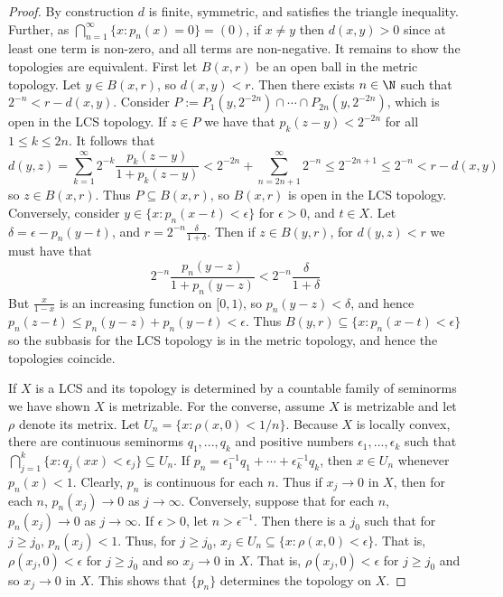 \begin{proof}
    By construction $d$ is finite, symmetric, and satisfies the triangle inequality. Further, as $\bigcap_{n=1}^{\infty}\{x:p_n(x)=0\}=(0)$, if $x\neq y$ then $d(x,y) > 0$ since at least one term is non-zero, and all terms are non-negative. It remains to show the topologies are equivalent. First let $B(x,r)$ be an open ball in the metric topology. Let $y \in B(x,r)$, so $d(x,y) < r$. Then there exists $n \in \N$ such that $2^{-n} < r-d(x,y)$. Consider $P := P_1(y,2^{-2n})\cap \cdots \cap P_{2n}(y,2^{-2n})$, which is open in the LCS topology. If $z \in P$ we have that $p_k(z-y) < 2^{-2n}$ for all $1\leq k \leq 2n$. It follows that $$d(y,z) = \sum_{k=1}^{\infty}2^{-k}\frac{p_k(z-y)}{1+p_k(z-y)} < 2^{-2n}+\sum_{n=2n+1}^{\infty}2^{-n} \leq  2^{-2n+1} \leq 2^{-n} < r-d(x,y)$$
    so $z \in B(x,r)$. Thus $P \subseteq B(x,r)$, so $B(x,r)$ is open in the LCS topology. Conversely, consider $y\in\{x:p_n(x-t) < \epsilon\}$ for $\epsilon > 0$, and $t \in X$. Let $\delta = \epsilon - p_n(y-t)$, and $r = 2^{-n}\frac{\delta}{1+\delta}$. Then if $z \in B(y,r)$, for $d(y,z) < r$ we must have that $$2^{-n}\frac{p_n(y-z)}{1+p_n(y-z)} < 2^{-n}\frac{\delta}{1+\delta}$$
    But $\frac{x}{1-x}$ is an increasing function on $[0,1)$, so $p_n(y-z) < \delta$, and hence $p_n(z-t) \leq p_n(y-z)+p_n(y-t) < \epsilon$. Thus $B(y,r) \subseteq \{x:p_n(x-t) < \epsilon\}$ so the subbasis for the LCS topology is in the metric topology, and hence the topologies coincide.

    If $X$ is a LCS and its topology is determined by a countable family of seminorms we have shown $X$ is metrizable. For the converse, assume $X$ is metrizable and let $\rho$ denote its metrix. Let $U_n = \{x:\rho(x,0) < 1/n\}$. Because $X$ is locally convex, there are continuous seminorms $q_1,...,q_k$ and positive numbers $\epsilon_1,...,\epsilon_k$ such that $\bigcap_{j=1}^k\{x:q_j(xx) < \epsilon_j\} \subseteq U_n$. If $p_n = \epsilon_1^{-1}q_1+\cdots+\epsilon_k^{-1}q_k$, then $x \in U_n$ whenever $p_n(x) < 1$. Clearly, $p_n$ is continuous for each $n$. Thus if $x_j\rightarrow 0$ in $X$, then for each $n$, $p_n(x_j)\rightarrow 0$ as $j\rightarrow \infty$. Conversely, suppose that for each $n$, $p_n(x_j)\rightarrow 0$ as $j\rightarrow \infty$. If $\epsilon > 0$, let $n > \epsilon^{-1}$. Then there is a $j_0$ such that for $j \geq j_0$, $p_n(x_j) < 1$. Thus, for $j \geq j_0$, $x_j \in U_n \subseteq \{x:\rho(x,0) < \epsilon\}$. That is, $\rho(x_j,0) < \epsilon$ for $j \geq j_0$ and so $x_j\rightarrow 0$ in $X$. That is, $\rho(x_j,0) < \epsilon$ for $j \geq j_0$ and so $x_j\rightarrow 0$ in $X$. This shows that $\{p_n\}$ determines the topology on $X$.
\end{proof}

